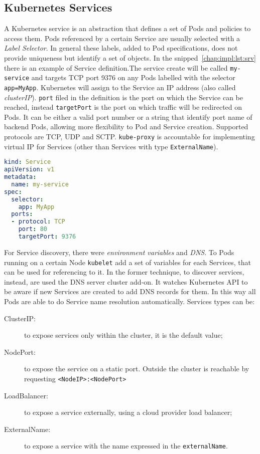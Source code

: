 \subsection{Kubernetes Services}
A Kubernetes service is an abstraction that defines a set of Pods and policies
to access them. Pods referenced by a certain Service are usually selected with a
\emph{Label Selector}. In general these labels, added to Pod specifications,
does not provide uniqueness but identify a set of objects.
In the snipped~\ref{chap:impl:lst:srv} there is an example of Service
definition.The service create will be called \texttt{my-service} and targets TCP
port 9376 on any Pods labelled with the selector \texttt{app=MyApp}. Kubernetes
will assign to the Service an IP address (also called \emph{clusterIP}). 
\texttt{port} filed in the definition is the port on which the Service can be
reached, instead \texttt{targetPort} is the port on which traffic will be
redirected on Pods. It can be either a valid port number or a string that
identify port name of backend Pods, allowing more flexibility to Pod and Service
creation. Supported protocols are TCP, UDP and SCTP. \texttt{kube-proxy} is
accountable for implementing virtual IP for Services (other than Services with
type \texttt{ExternalName}). 

\begin{lstlisting}[caption={Example of Service definition},
                   captionpos=b, language=yaml, label=chap:impl:lst:srv]
kind: Service
apiVersion: v1
metadata:
  name: my-service
spec:
  selector:
    app: MyApp
  ports:
  - protocol: TCP
    port: 80
    targetPort: 9376
\end{lstlisting}

For Service discovery, there were \emph{environment variables} and \emph{DNS}.
To Pods running on a certain Node \texttt{kubelet} add a set of variables for
each Services, that can be used for referencing to it. In the former technique,
to discover services, instead, are used the DNS server cluster add-on. It
watches Kubernetes API to be aware if new Services are created to add DNS
records for them. In this way all Pods are able to do Service name resolution
automatically. Services types can be:
\begin{description}
\item[ClusterIP:] to expose services only within the cluster, it is the default
value;
\item[NodePort:] to expose the service on a static port. Outside the cluster is
reachable by requesting \verb!<NodeIP>:<NodePort>!
\item[LoadBalancer:] to expose a service externally, using a cloud provider
load balancer;
\item[ExternalName:] to expose a service with the name expressed in the 
\texttt{externalName}.
\end{description}

